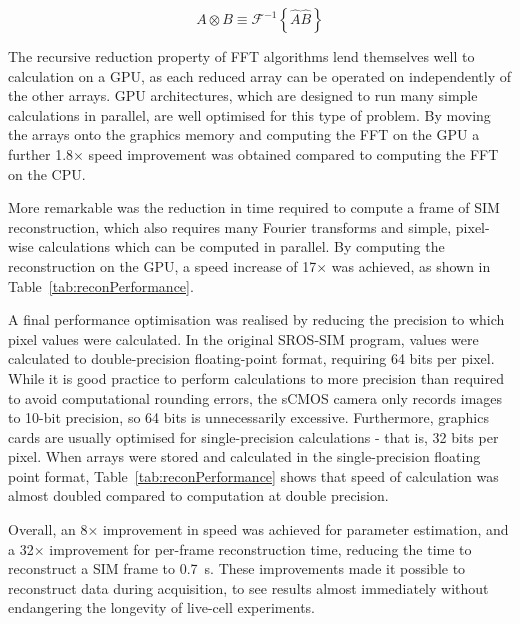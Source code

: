\begin{equation} \label{eq:fourier-correlation}
A \otimes B \equiv \mathcal{F}^{-1}\left\lbrace\hat{A}\hat{B}\right\rbrace
\end{equation}

The recursive reduction property of FFT algorithms lend themselves well to calculation on a GPU, as each reduced array can be operated on independently of the other arrays. 
GPU architectures, which are designed to run many simple calculations in parallel, are well optimised for this type of problem. 
By moving the arrays onto the graphics memory and computing the FFT on the GPU a further 1.8$\times$ speed improvement was obtained compared to computing the FFT on the CPU. 

More remarkable was the reduction in time required to compute a frame of SIM reconstruction, which also requires many Fourier transforms and simple, pixel-wise calculations which can be computed in parallel. 
By computing the reconstruction on the GPU, a speed increase of 17$\times$ was achieved, as shown in Table~\ref{tab:reconPerformance}. 

A final performance optimisation was realised by reducing the precision to which pixel values were calculated. 
In the original SROS-SIM program, values were calculated to double-precision floating-point format, requiring 64 bits per pixel.
While it is good practice to perform calculations to more precision than required to avoid computational rounding errors, the sCMOS camera only records images to 10-bit precision, so 64 bits is unnecessarily excessive.
Furthermore, graphics cards are usually optimised for single-precision calculations - that is, 32 bits per pixel. 
When arrays were stored and calculated in the single-precision floating point format, Table~\ref{tab:reconPerformance} shows that speed of calculation was almost doubled compared to computation at double precision. 

Overall, an 8$\times$ improvement in speed was achieved for parameter estimation, and a 32$\times$ improvement for per-frame reconstruction time, reducing the time to reconstruct a SIM frame to \SI{0.7}{\second}. 
These improvements made it possible to reconstruct data during acquisition, to see results almost immediately without endangering the longevity of live-cell experiments. 


